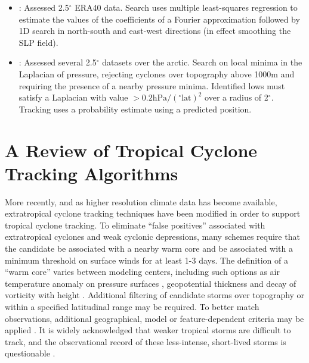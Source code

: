 \documentclass[gmdd, hvmath]{copernicus}
\begin{document}
\begin{itemize}
\item \cite{benestad2006use}:  Assessed 2.5$^\circ$ ERA40 data.  Search uses multiple least-squares regression to estimate the values of the coefficients of a Fourier approximation followed by 1D search in north-south and east-west directions (in effect smoothing the SLP field).

\item \cite{simmonds2008arctic}:  Assessed several 2.5$^\circ$ datasets over the arctic.  Search on local minima in the Laplacian of pressure, rejecting cyclones over topography above 1000m and requiring the presence of a nearby pressure minima.  Identified lows must satisfy a Laplacian with value $> 0.2 \mbox{hPa} / (^\circ \mbox{lat})^2$ over a radius of 2$^\circ$.  Tracking uses a probability estimate using a predicted position.



\end{itemize}

\section{A Review of Tropical Cyclone Tracking Algorithms} \label{sec:TropicalCycloneAlgorithms}

More recently, and as higher resolution climate data has become available, extratropical cyclone tracking techniques have been modified in order to support tropical cyclone tracking.  To eliminate ``false positives'' associated with extratropical cyclones and weak cyclonic depressions, many schemes require that the candidate be associated with a nearby warm core and be associated with a minimum threshold on surface winds for at least 1-3 days.  The definition of a ``warm core'' varies between modeling centers, including such options as air temperature anomaly on pressure surfaces \citep{vitart1997simulation,zhao2009simulations,murakami2012future}, geopotential thickness \citep{tsutsui1996simulated} and decay of vorticity with height \citep{Bengtsson2007,strachan2013investigating}.  Additional filtering of candidate storms over topography or within a specified latitudinal range may be required.  To better match observations, additional geographical, model or feature-dependent criteria may be applied \citep{camargo2002improving,walsh2007objectively,Murakami2010,Murakami2012}. It is widely acknowledged that weaker tropical storms are difficult to track, and the observational record of these less-intense, short-lived storms is questionable \citep{Landsea2010}.
\end{document}

